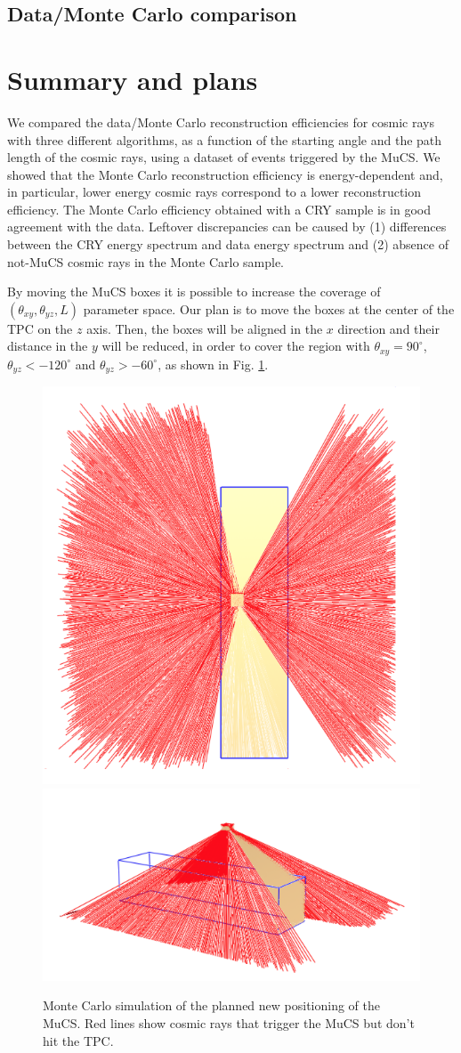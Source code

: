 \documentclass[a4paper]{scrartcl}
\begin{document}
\subsection{Data/Monte Carlo comparison}

\clearpage{}

\section{Summary and plans}
We compared the data/Monte Carlo reconstruction efficiencies for cosmic rays  with three different algorithms, as a function of the starting angle and the path length of the cosmic rays, using a dataset of events triggered by the MuCS. We showed that the Monte Carlo reconstruction efficiency is energy-dependent and, in particular, lower energy cosmic rays correspond to a lower reconstruction efficiency. The Monte Carlo efficiency obtained with a CRY sample is in good agreement with the data.  Leftover discrepancies can be caused by (1) differences between the CRY energy spectrum and data energy spectrum and (2) absence of not-MuCS cosmic rays in the Monte Carlo sample.

By moving the MuCS boxes it is possible to increase the coverage of $(\theta_{xy}, \theta_{yz}, L)$ parameter space.
Our plan is to move the boxes at the center of the TPC on the $z$ axis. Then, the boxes will be aligned in the $x$ direction and their distance in the $y$ will be reduced, in order to cover the region with $\theta_{xy} = 90^{\circ}$, $\theta_{yz} < -120^{\circ}$ and $\theta_{yz} > -60^{\circ}$, as shown in Fig. \ref{fig:plans}.

\begin{figure}[htbp]
  \begin{center}
    \includegraphics[width=0.3\linewidth]{figures/image.png}\includegraphics[width=0.65\linewidth]{figures/image2.png}
  \end{center}
  \caption{Monte Carlo simulation of the planned new positioning of the MuCS. Red lines show cosmic rays that trigger the MuCS but don't hit the TPC.}\label{fig:plans}
\end{figure}
\end{document}
